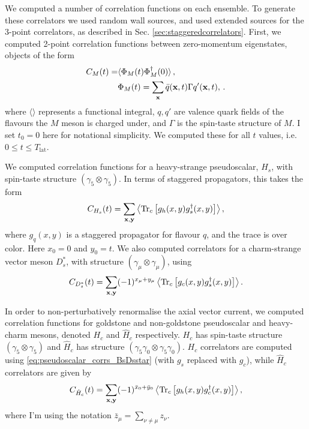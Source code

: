 We computed a number of correlation functions on each ensemble. To generate these correlators we used random wall sources, and used extended sources for the 3-point correlators, as described in Sec. \ref{sec:staggeredcorrelators}. First, we computed 2-point correlation functions between zero-momentum eigenstates, objects of the form
\begin{align}
  C_{M}(t) =& \langle \Phi_M (t) \Phi_M^{\dagger}(0) \rangle\,, \\ 
  &\Phi_M(t) = \sum_{{\bf{x}}} \bar{q}({\bf{x}},t) \Gamma q'({\bf{x}},t), \nonumber\,.
\end{align}
where $\langle \rangle$ represents a functional integral, $q,q'$ are valence quark fields of the flavours the $M$ meson is charged under, and $\Gamma$ is the spin-taste structure of $M$. I set $t_0=0$ here for notational simplicity. We computed these for all $t$ values, i.e. $0\leq t \leq T_{\text{lat}}$. 

We computed correlation functions for a heavy-strange pseudoscalar, $H_s$, with spin-taste structure $(\gamma_5\otimes \gamma_5)$. In terms of staggered propagators, this takes the form
\begin{align}
  C_{H_s}(t) = \sum_{\bf{x},\bf{y}} \left\langle \text{Tr}_c\left[ g_h(x,y) g_s^{\dagger}(x,y) \right] \right\rangle,
  \label{eq:pseudoscalar_corrs_BsDsstar}
\end{align}
where $g_q(x,y)$ is a staggered propagator for flavour $q$, and the trace is over color. Here $x_0=0$ and $y_0=t$. We also computed correlators for a charm-strange vector meson $D_s^*$, with structure $(\gamma_{\mu}\otimes \gamma_{\mu})$, using
\begin{align}
  C_{D_s^*}(t) = \sum_{\bf{x},\bf{y}} (-1)^{x_{\mu}+y_{\mu}} \left\langle \text{Tr}_c\left[ g_c(x,y) g_s^{\dagger}(x,y) \right] \right\rangle.
\end{align}

In order to non-perturbatively renormalise the axial vector current, we computed correlation functions for goldstone and non-goldstone pseudoscalar and heavy-charm mesons, denoted $H_c$ and $\hat{H}_c$ respectively. $H_c$ has spin-taste structure $(\gamma_5\otimes \gamma_5)$ and $\hat{H}_c$ has structure $(\gamma_5\gamma_0\otimes \gamma_5\gamma_0)$. $H_c$ correlators are computed using \eqref{eq:pseudoscalar_corrs_BsDsstar} (with $g_s$ replaced with $g_c$), while $\hat{H}_c$ correlators are given by
\begin{align}
  C_{\hat{H}_c}(t) = \sum_{\bf{x},\bf{y}}(-1)^{\bar{x}_0+\bar{y}_0} \left\langle \text{Tr}_c\left[ g_h(x,y) g^{\dagger}_c(x,y) \right] \right\rangle,
\end{align}
where I'm using the notation $\bar{z}_{\mu} = \sum_{\nu\neq\mu} z_{\nu}$.

